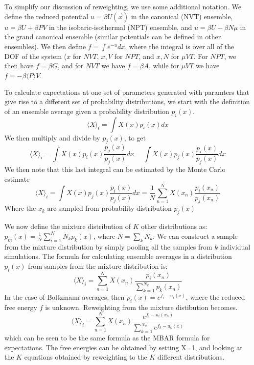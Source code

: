 \documentclass[aps,pre,twocolumn,nofootinbib,superscriptaddress,linenumbers,10pt, draft,tightenlines]{revtex4-1}
\begin{document}
To simplify our discussion of reweighting, we use some additional
notation.  We define the reduced potential $u = \beta U(\vec{x})$ in
the canonical (NVT) ensemble, $u = \beta U + \beta PV$ in the
isobaric-isothermal (NPT) ensemble, and $u = \beta U - \beta N\mu$ in
the grand canonical ensemble (similar potentials can be defined in
other ensembles). We then define $f = \int e^{-u} dx$, where the
integral is over all of the DOF of the system ($x$ for $NVT$, $x,V$ for
$NPT$, and $x,N$ for $\mu VT$.  For $NPT$, we then have $f = \beta G$, and for $NVT$
we have $f = \beta A$, while for $\mu V T$ we have $f = -\beta \langle
P \rangle V$.

To calculate expectations at one set of parameters generated with
paramters that give rise to a different set of probability
distributions, we start with the definition of an ensemble average
given a probability distribution $p_i(x)$. 
\begin{equation}
\langle X \rangle_i = \int X(x) p_i(x) dx 
\end{equation}
We then multiply and divide by $p_j(x)$, to get
\begin{equation}
\langle X \rangle_i = \int X(x) p_i(x) \frac{p_j(x)}{p_j(x)}dx = \int X(x) p_j(x) \frac{p_i(x)}{p_j(x)}dx 
\end{equation}
We then note that this last integral can be estimated by the Monte Carlo estimate
\begin{equation}
\langle X \rangle_i = \int X(x) p_j(x) \frac{p_i(x)}{p_j(x)}dx = \frac{1}{N}\sum_{n=1}^N X(x_n) \frac{p_i(x_n)}{p_j(x_n)}
\end{equation}
Where the $x_k$ are sampled from probability distribution $p_j(x)$

We now define the mixture distribution of $K$ other distributions as:
$p_m(x) = \frac{1}{N} \sum_{i=1}^N N_k p_k(x)$, where $N = \sum_k
N_k$.  We can construct a sample from the mixture distribution by
simply pooling all the samples from $k$ individual simulations.
The formula for calculating ensemble averages in a distribution $p_i(x)$
from samples from the mixture distribution is:
\begin{equation}
\langle X \rangle_i = \sum_{n=1}^N X(x_n) \frac{p_i(x_n)}{\sum_{k=1}^{N_k} p_k(x_n)}
\end{equation}
In the case of Boltzmann averages, then $p_i(x) = e^{f_i-u_i(x)}$, where
the reduced free energy $f$ is unknown.  Reweighting from the mixture
distibution becomes.
\begin{equation}
\langle X \rangle_i = \sum_{n=1}^N X(x_n) \frac{e^{f_i - u_i(x_n)}}{\sum_{k=1}^{N_k} e^{f_k - u_k(x)}}
\end{equation}
which can be seen to be the same formula as the MBAR formula for
expectations. The free energies can be obtained by setting X=1, and
looking at the $K$ equations obtained by reweighting to the $K$
different distributions. 
\end{document}
